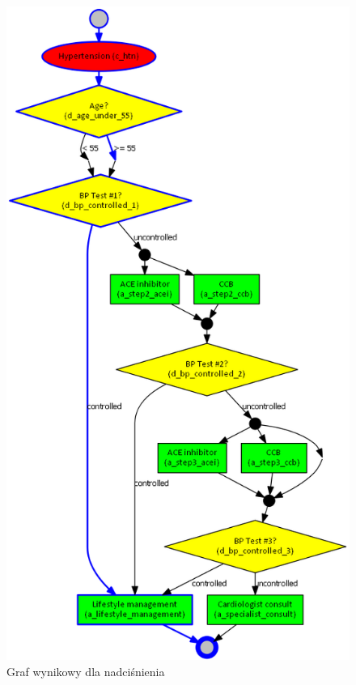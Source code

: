 \begin{figure}[H]
\centering
\includegraphics[scale=0.45]{img/rozwiazanie1htn-ver-3.png}
\caption{Graf wynikowy dla nadciśnienia}
\label{fig:rozw_htn}
\end{figure}


\newpage
